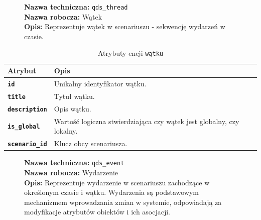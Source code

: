 \begin{figure}[H]
    \centering
    \begin{minipage}{0.8\textwidth}
        \begin{framed}
            \noindent\textbf{\large Nazwa techniczna:} \texttt{qds\_thread} \\
            \textbf{\large Nazwa robocza:} Wątek \\
            \textbf{\large Opis:} Reprezentuje wątek w scenariuszu - sekwencję wydarzeń w czasie.
        \end{framed}
    \end{minipage}
\end{figure}

\begin{table}[H]
    \centering
    \renewcommand{\arraystretch}{1.6}
    \begin{tabular}{|>{\bfseries}l|p{}|}
        \hline
        \rowcolor[HTML]{EFEFEF} \textbf{Atrybut} & \textbf{Opis} \\
        \hline
        \texttt{id} & Unikalny identyfikator wątku. \\
        \hline
        \texttt{title} & Tytuł wątku. \\
        \hline
        \texttt{description} & Opis wątku. \\
        \hline
        \texttt{is\_global} & Wartość logiczna stwierdziająca czy wątek jest globalny, czy lokalny. \\
        \hline
        \texttt{scenario\_id} & Klucz obcy scenariusza. \\
        \hline
    \end{tabular}
    \caption{Atrybuty encji \texttt{wątku}}
\end{table}

\begin{figure}[H]
    \centering
    \begin{minipage}{0.8\textwidth}
        \begin{framed}
            \noindent\textbf{\large Nazwa techniczna:} \texttt{qds\_event} \\
            \textbf{\large Nazwa robocza:} Wydarzenie \\
            \textbf{\large Opis:} Reprezentuje wydarzenie w scenariuszu zachodzące w określonym czasie i wątku.
            Wydarzenia są podstawowym mechanizmem wprowadzania zmian w systemie,
            odpowiadają za modyfikacje atrybutów obiektów i ich asocjacji.
        \end{framed}
    \end{minipage}
\end{figure}

